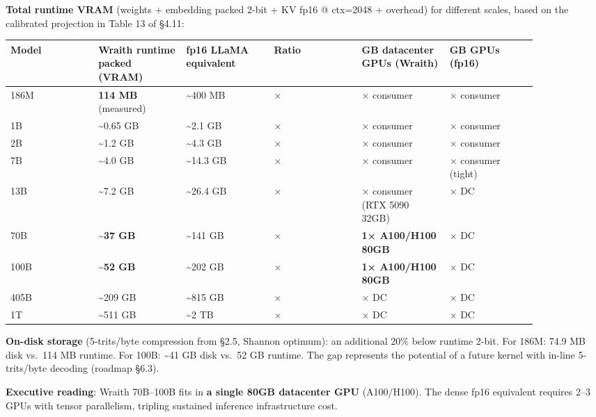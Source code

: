 \textbf{Total runtime VRAM} (weights + embedding packed 2-bit + KV fp16
@ ctx=2048 + overhead) for different scales, based on the calibrated
projection in Table 13 of §4.11:

{\def\LTcaptype{none} %
{\footnotesize\setlength{\tabcolsep}{3pt}
\begin{longtable}[]{@{}>{\raggedright\arraybackslash}p{0.147\linewidth}>{\raggedright\arraybackslash}p{0.147\linewidth}>{\raggedright\arraybackslash}p{0.147\linewidth}>{\raggedright\arraybackslash}p{0.147\linewidth}>{\raggedright\arraybackslash}p{0.147\linewidth}>{\raggedright\arraybackslash}p{0.147\linewidth}@{}}
\toprule\noalign{}
Model & Wraith runtime packed (VRAM) & fp16 LLaMA equivalent & Ratio & 80 GB datacenter GPUs (Wraith) & 80 GB GPUs (fp16) \\
\midrule\noalign{}
\endhead
\bottomrule\noalign{}
\endlastfoot
186M & \textbf{114 MB} (measured) & \textasciitilde400 MB & 3.5× & 1×
consumer & 1× consumer \\
1B & \textasciitilde0.65 GB & \textasciitilde2.1 GB & 3.2× & 1× consumer
& 1× consumer \\
2B & \textasciitilde1.2 GB & \textasciitilde4.3 GB & 3.6× & 1× consumer
& 1× consumer \\
7B & \textasciitilde4.0 GB & \textasciitilde14.3 GB & 3.6× & 1× consumer
& 1× consumer (tight) \\
13B & \textasciitilde7.2 GB & \textasciitilde26.4 GB & 3.7× & 1×
consumer (RTX 5090 32GB) & 1× DC \\
70B & \textbf{\textasciitilde37 GB} & \textasciitilde141 GB & 3.8× &
\textbf{1× A100/H100 80GB} & 2× DC \\
100B & \textbf{\textasciitilde52 GB} & \textasciitilde202 GB & 3.9× &
\textbf{1× A100/H100 80GB} & 3× DC \\
405B & \textasciitilde209 GB & \textasciitilde815 GB & 3.9× & 3× DC &
11× DC \\
1T & \textasciitilde511 GB & \textasciitilde2 TB & 3.9× & 7× DC & 25×
DC \\
\end{longtable}
}
}

\textbf{On-disk storage} (5-trits/byte compression from §2.5, Shannon
optimum): an additional 20\% below runtime 2-bit. For 186M: 74.9 MB disk
vs.~114 MB runtime. For 100B: \textasciitilde41 GB disk vs.~52 GB
runtime. The gap represents the potential of a future kernel with
in-line 5-trits/byte decoding (roadmap §6.3).

\textbf{Executive reading}: Wraith 70B--100B fits in \textbf{a single
80GB datacenter GPU} (A100/H100). The dense fp16 equivalent requires
2--3 GPUs with tensor parallelism, tripling sustained inference
infrastructure cost.


